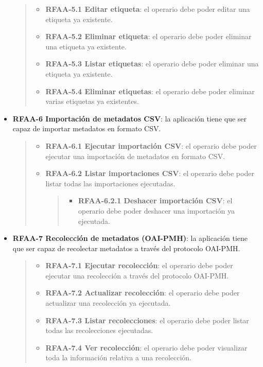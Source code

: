 \documentclass[
]{article}
\providecommand{\tightlist}{%
  \setlength{\itemsep}{0pt}\setlength{\parskip}{0pt}}
\begin{document}
\begin{itemize}
  \begin{quote}
  \begin{itemize}
  \tightlist
  \item
    \textbf{RFAA-5.1 Editar etiqueta}: el operario debe poder editar una
    etiqueta ya existente.
  \item
    \textbf{RFAA-5.2 Eliminar etiqueta}: el operario debe poder eliminar
    una etiqueta ya existente.
  \item
    \textbf{RFAA-5.3 Listar etiquetas}: el operario debe poder eliminar
    una etiqueta ya existente.
  \item
    \textbf{RFAA-5.4 Eliminar etiquetas}: el operario debe poder
    eliminar varias etiquetas ya existentes.
  \end{itemize}
  \end{quote}
\item
  \textbf{RFAA-6 Importación de metadatos CSV}: la aplicación tiene que
  ser capaz de importar metadatos en formato CSV.

  \begin{quote}
  \begin{itemize}
  \item
    \textbf{RFAA-6.1 Ejecutar importación CSV}: el operario debe poder
    ejecutar una importación de metadatos en formato CSV.
  \item
    \textbf{RFAA-6.2 Listar importaciones CSV}: el operario debe poder
    listar todas las importaciones ejecutadas.

    \begin{quote}
    \begin{itemize}
    \tightlist
    \item
      \textbf{RFAA-6.2.1 Deshacer importación CSV}: el operario debe
      poder deshacer una importación ya ejecutada.
    \end{itemize}
    \end{quote}
  \end{itemize}
  \end{quote}
\item
  \textbf{RFAA-7 Recolección de metadatos (OAI-PMH)}: la aplicación
  tiene que ser capaz de recolectar metadatos a través del protocolo
  OAI-PMH.

  \begin{quote}
  \begin{itemize}
  \item
    \textbf{RFAA-7.1 Ejecutar recolección}: el operario debe poder
    ejecutar una recolección a través del protocolo OAI-PMH.
  \item
    \textbf{RFAA-7.2 Actualizar recolección}: el operario debe poder
    actualizar una recolección ya ejecutada.
  \item
    \textbf{RFAA-7.3 Listar recolecciones}: el operario debe poder
    listar todas las recolecciones ejecutadas.
  \item
    \textbf{RFAA-7.4 Ver recolección}: el operario debe poder visualizar
    toda la información relativa a una recolección.


\end{itemize}
\end{quote}
\end{itemize}
\end{document}
